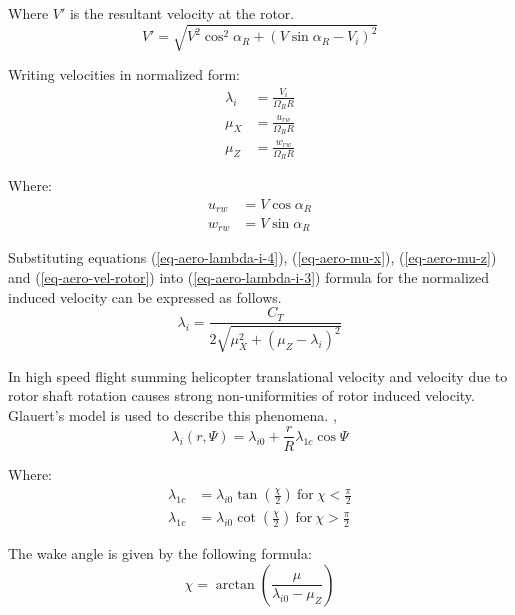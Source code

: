Where $V'$ is the resultant velocity at the rotor.
\begin{equation}
  \label{eq-aero-vel-rotor}
  V' = \sqrt{
    V^2 \cos^2 \alpha_R
    + \left( V \sin \alpha_R - V_i \right)^2
  }
\end{equation}

Writing velocities in normalized form:
\begin{align}
  \label{eq-aero-lambda-i-4}
  \lambda_i &= \frac{V_i}    { \Omega_R R } \\
  \label{eq-aero-mu-x}
  \mu_X     &= \frac{u_{rw}} { \Omega_R R } \\
  \label{eq-aero-mu-z}
  \mu_Z     &= \frac{w_{rw}} { \Omega_R R }
\end{align}

Where:
\begin{align}
  u_{rw} &= V \cos \alpha_R \\
  w_{rw} &= V \sin \alpha_R
\end{align}

Substituting equations (\ref{eq-aero-lambda-i-4}), (\ref{eq-aero-mu-x}), (\ref{eq-aero-mu-z}) and (\ref{eq-aero-vel-rotor}) into (\ref{eq-aero-lambda-i-3}) formula for the normalized induced velocity can be expressed as follows.
\begin{equation}
  \label{eq-aero-lambda-i-5}
  \lambda_i
  =
  \frac{C_T}{ 2 \sqrt{ \mu_X^2 + \left( \mu_Z - \lambda_i \right)^2 } }
\end{equation}

In high speed flight summing helicopter translational velocity and velocity due to rotor shaft rotation causes strong non-uniformities of rotor induced velocity. Glauert’s model is used to describe this phenomena. \cite{Padfield2007}, \cite{Bramwell2001}
\begin{equation}
  \lambda_i \left( r, \Psi \right)
  =
  \lambda_{i0} + \frac{r}{R} \lambda_{1c} \cos \Psi
\end{equation}

Where:
\begin{align}
  \lambda_{1c} &= \lambda_{i0} \tan \left( \frac{\chi}{2} \right)
  \mathrm{~for~} \chi < \frac{\pi}{2} \\
  \lambda_{1c} &= \lambda_{i0} \cot \left( \frac{\chi}{2} \right)
  \mathrm{~for~} \chi > \frac{\pi}{2}
\end{align}

The wake angle is given by the following formula:
\begin{equation}
  \chi = \arctan \left( \frac{\mu}{ \lambda_{i0} - \mu_Z } \right)
\end{equation}

